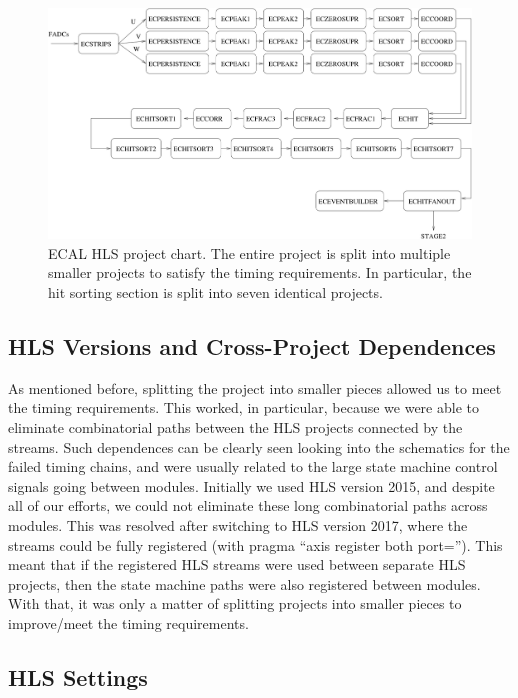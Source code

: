 \begin{figure}[hbt]
	\centering
	\includegraphics[width=1.0\columnwidth,keepaspectratio]{img/hls_chart.png}
	\caption{ECAL HLS project chart. The entire project is split into multiple smaller projects to satisfy the timing requirements. In particular, the hit sorting section is split into seven identical projects.}
	\label{fig:hls_chart}
\end{figure}


\subsection{HLS Versions and Cross-Project Dependences}

As mentioned before, splitting the project into smaller pieces allowed us to meet the timing requirements. This worked, in particular, because we were able to eliminate combinatorial paths between the HLS projects connected by the streams. Such dependences can be clearly seen looking into the schematics for the failed timing chains, and were usually related to the large state machine control signals going between modules. Initially we used HLS version 2015, and despite all of our efforts, we could not eliminate these long combinatorial paths across modules. This was resolved after switching to HLS version 2017, where the streams could be fully registered (with pragma ``axis register both port=''). This meant that if the registered HLS streams were used between separate HLS projects, then the state machine paths were also registered between modules. With that, it was only a matter of splitting projects into smaller pieces to improve/meet the timing requirements.


\subsection{HLS Settings}

